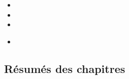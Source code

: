 \begin{ASM_chapter}
\begin{itemize}
	\item	{}
	\item	{}
	\item	{}
\end{itemize}
\end{ASM_chapter}

\begin{YTB_vids}
\begin{itemize}
	\item	
\end{itemize}
\end{YTB_vids}

\subsection{Résumés des chapitres}


